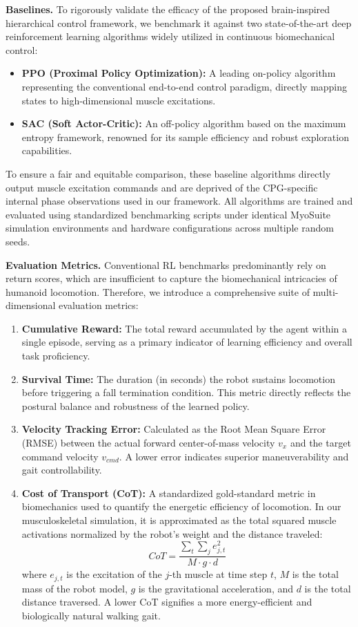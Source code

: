 \documentclass[lettersize,journal]{IEEEtran}
\begin{document}
\textbf{Baselines.} To rigorously validate the efficacy of the proposed brain-inspired hierarchical control framework, we benchmark it against two state-of-the-art deep reinforcement learning algorithms widely utilized in continuous biomechanical control:
\begin{itemize}
    \item \textbf{PPO (Proximal Policy Optimization):} A leading on-policy algorithm representing the conventional end-to-end control paradigm, directly mapping states to high-dimensional muscle excitations.
    \item \textbf{SAC (Soft Actor-Critic):} An off-policy algorithm based on the maximum entropy framework, renowned for its sample efficiency and robust exploration capabilities.
\end{itemize}
To ensure a fair and equitable comparison, these baseline algorithms directly output muscle excitation commands and are deprived of the CPG-specific internal phase observations used in our framework. 
All algorithms are trained and evaluated using standardized benchmarking scripts under identical MyoSuite simulation environments and hardware configurations across multiple random seeds.

\textbf{Evaluation Metrics.} Conventional RL benchmarks predominantly rely on return scores, which are insufficient to capture the biomechanical intricacies of humanoid locomotion. 
Therefore, we introduce a comprehensive suite of multi-dimensional evaluation metrics:
\begin{enumerate}
    \item \textbf{Cumulative Reward:} The total reward accumulated by the agent within a single episode, serving as a primary indicator of learning efficiency and overall task proficiency.
    \item \textbf{Survival Time:} The duration (in seconds) the robot sustains locomotion before triggering a fall termination condition. 
    This metric directly reflects the postural balance and robustness of the learned policy.
    \item \textbf{Velocity Tracking Error:} Calculated as the Root Mean Square Error (RMSE) between the actual forward center-of-mass velocity $v_x$ and the target command velocity $v_{cmd}$. 
    A lower error indicates superior maneuverability and gait controllability.
    \item \textbf{Cost of Transport (CoT):} A standardized gold-standard metric in biomechanics used to quantify the energetic efficiency of locomotion. 
    In our musculoskeletal simulation, it is approximated as the total squared muscle activations normalized by the robot's weight and the distance traveled:
    \begin{equation}
        CoT = \frac{\sum_{t} \sum_{j} e_{j,t}^2}{M \cdot g \cdot d}
    \end{equation}
    where $e_{j,t}$ is the excitation of the $j$-th muscle at time step $t$, $M$ is the total mass of the robot model, $g$ is the gravitational acceleration, and $d$ is the total distance traversed. A lower CoT signifies a more energy-efficient and biologically natural walking gait.
\end{enumerate}
\end{document}
